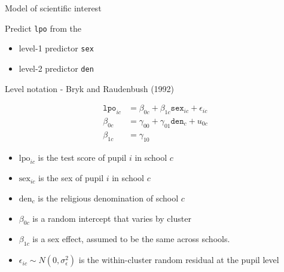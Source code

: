 \documentclass[ignorenonframetext,aspectratio=43]{beamer}
\providecommand{\tightlist}{%
  \setlength{\itemsep}{0pt}\setlength{\parskip}{0pt}}
\begin{document}
\begin{frame}[fragile]{Model of scientific interest}
\protect\hypertarget{model-of-scientific-interest}{}

Predict \texttt{lpo} from the

\begin{itemize}
\tightlist
\item
  level-1 predictor \texttt{sex}
\item
  level-2 predictor \texttt{den}
\end{itemize}

\end{frame}

\begin{frame}{Level notation - Bryk and Raudenbush (1992)}
\protect\hypertarget{level-notation---bryk-and-raudenbush-1992}{}

\begin{align}
{{\texttt{lpo}}}_{ic} & = \beta_{0c} + \beta_{1c}{{\texttt{sex}}}_{ic} + \epsilon_{ic}\\
\beta_{0c}     & = \gamma_{00} + \gamma_{01}{{\texttt{den}}}_{c} + u_{0c}\\
\beta_{1c}     & = \gamma_{10}
\end{align}

\begin{itemize}
\tightlist
\item
  \(\text{lpo}_{ic}\) is the test score of pupil \(i\) in school \(c\)
\item
  \(\text{sex}_{ic}\) is the sex of pupil \(i\) in school \(c\)
\item
  \(\text{den}_c\) is the religious denomination of school \(c\)
\item
  \(\beta_{0c}\) is a random intercept that varies by cluster
\item
  \(\beta_{1c}\) is a sex effect, assumed to be the same across schools.
\item
  \(\epsilon_{ic} \sim N(0, \sigma_\epsilon^2)\) is the within-cluster
  random residual at the pupil level
\end{itemize}

\end{frame}
\end{document}
